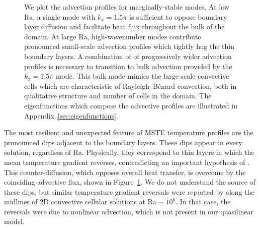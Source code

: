 \documentclass[reprint,amsmath,amssymb,aps,nofootinbib]{revtex4-1}
\newcommand\Ra{\mathrm{Ra}}
\begin{document}
\begin{figure}
{    We plot the advection profiles for marginally-stable modes. 
    At low $\Ra$, a single mode with $k_x = 1.5\pi$ is sufficient to oppose boundary layer diffusion and facilitate heat flux throughout the bulk of the domain. 
    At large $\Ra$, high-wavenumber modes contribute pronounced small-scale advection profiles which tightly hug the thin boundary layers. 
    A combination of of progressively wider advection profiles is necessary to transition to bulk advection provided by the $k_x = 1.5\pi$ mode. 
    This bulk mode mimics the large-scale convective cells which are characteristic of Rayleigh–Bénard convection, both in qualitative structure and number of cells in the domain.
    The eigenfunctions which compose the advective profiles are illustrated in Appendix~\ref{sec:eigenfunctions}.}
    \label{fig:flux}
\end{figure}

The most resilient and unexpected feature of MSTE temperature profiles are the pronounced dips adjacent to the boundary layers. 
These dips appear in every solution, regardless of $\Ra$. 
Physically, they correspond to thin layers in which the mean temperature gradient reverses, contradicting an important hypothesis of \cite{Malkus_1954}. 
This counter-diffusion, which opposes overall heat transfer, is overcome by the coinciding advective flux, shown in Figure~\ref{fig:flux}. 
We do not understand the source of these dips, but similar temperature gradient reversals were reported by \cite{chini_cells} along the midlines of 2D convective cellular solutions at $\Ra \sim 10^6$.
In that case, the reversals were due to nonlinear advection, which is not present in our quasilinear model. 
\end{document}
